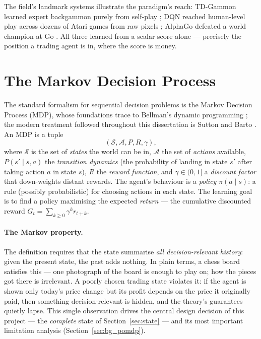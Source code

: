 The field's landmark systems illustrate the paradigm's reach:
TD-Gammon learned expert backgammon purely from self-play
\cite{tesauro1995}; DQN reached human-level play across dozens of Atari
games from raw pixels \cite{mnih2015}; AlphaGo defeated a world champion
at Go \cite{silver2016}. All three learned from a scalar score alone ---
precisely the position a trading agent is in, where the score is money.

\section{The Markov Decision Process}
\label{sec:bg_mdp}

The standard formalism for sequential decision problems is the Markov
Decision Process (MDP), whose foundations trace to Bellman's dynamic
programming \cite{bellman1957}; the modern treatment followed throughout
this dissertation is Sutton and Barto \cite{sutton2018}. An MDP is a
tuple
\[
(\mathcal{S}, \mathcal{A}, P, R, \gamma),
\]
where $\mathcal{S}$ is the set of \emph{states} the world can be in,
$\mathcal{A}$ the set of \emph{actions} available, $P(s' \mid s, a)$ the
\emph{transition dynamics} (the probability of landing in state $s'$
after taking action $a$ in state $s$), $R$ the \emph{reward function},
and $\gamma \in (0,1]$ a \emph{discount factor} that down-weights distant
rewards. The agent's behaviour is a \emph{policy} $\pi(a \mid s)$: a rule
(possibly probabilistic) for choosing actions in each state. The learning
goal is to find a policy maximising the expected \emph{return} --- the
cumulative discounted reward
$G_t = \sum_{k \ge 0} \gamma^k r_{t+k}$.

\paragraph{The Markov property.} The definition requires that the state
summarise \emph{all decision-relevant history}: given the present state,
the past adds nothing. In plain terms, a chess board satisfies this ---
one photograph of the board is enough to play on; how the pieces got
there is irrelevant. A poorly chosen trading state violates it: if the
agent is shown only today's price change but its profit depends on the
price it originally paid, then something decision-relevant is hidden, and
the theory's guarantees quietly lapse. This single observation drives the
central design decision of this project --- the \emph{complete} state of
Section~\ref{sec:state} --- and its most important limitation analysis
(Section~\ref{sec:bg_pomdp}).

